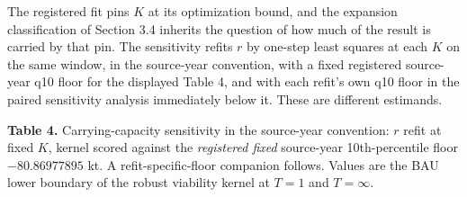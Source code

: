 \documentclass[11pt]{article}
\begin{document}
The registered fit pins \(K\) at its optimization bound, and the
expansion classification of Section 3.4 inherits the question of how
much of the result is carried by that pin. The sensitivity refits \(r\)
by one-step least squares at each \(K\) on the same window, in the
source-year convention, with a fixed registered source-year q10 floor for the displayed
Table 4, and with each refit's own q10 floor in the paired sensitivity
analysis immediately below it. These are different estimands.

\textbf{Table 4.} Carrying-capacity sensitivity in the source-year
convention: \(r\) refit at fixed \(K\), kernel scored against the
\emph{registered fixed} source-year 10th-percentile floor
\(-80.86977895\) kt. A refit-specific-floor companion follows. Values are the BAU lower
boundary of the robust viability kernel at \(T=1\) and \(T=\infty\).
\end{document}
